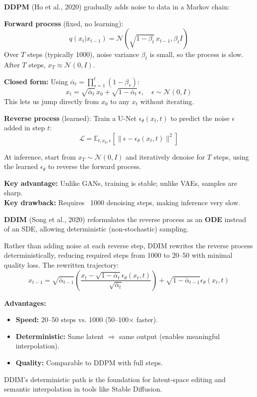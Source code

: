 \begin{paperbox}[title={DDPM: Denoising Diffusion Probabilistic Models}]
\textbf{DDPM} (Ho et al., 2020) gradually adds noise to data in a Markov chain:

\textbf{Forward process} (fixed, no learning):
\[
q(x_t | x_{t-1}) = \mathcal{N}\left(\sqrt{1 - \beta_t} \, x_{t-1}, \beta_t I\right)
\]
Over $T$ steps (typically 1000), noise variance $\beta_t$ is small, so the process is slow. After $T$ steps, $x_T \approx \mathcal{N}(0, I)$.

\textbf{Closed form:} Using $\bar{\alpha}_t = \prod_{s=1}^t (1 - \beta_s)$:
\[
x_t = \sqrt{\bar{\alpha}_t} \, x_0 + \sqrt{1 - \bar{\alpha}_t} \, \epsilon, \quad \epsilon \sim \mathcal{N}(0, I)
\]
This lets us jump directly from $x_0$ to any $x_t$ without iterating.

\textbf{Reverse process} (learned): Train a U-Net $\epsilon_\theta(x_t, t)$ to predict the noise $\epsilon$ added in step $t$:
\[
\mathcal{L} = \mathbb{E}_{t, x_0, \epsilon}[\|\epsilon - \epsilon_\theta(x_t, t)\|^2]
\]

\begin{intuitionbox}
At inference, start from $x_T \sim \mathcal{N}(0, I)$ and iteratively denoise for $T$ steps, using the learned $\epsilon_\theta$ to reverse the forward process.
\end{intuitionbox}

\textbf{Key advantage:} Unlike GANs, training is stable; unlike VAEs, samples are sharp. \\
\textbf{Key drawback:} Requires ~1000 denoising steps, making inference very slow.
\end{paperbox}

\begin{paperbox}[title={DDIM: Deterministic Sampling}]
\textbf{DDIM} (Song et al., 2020) reformulates the reverse process as an \textbf{ODE} instead of an SDE, allowing deterministic (non-stochastic) sampling.

Rather than adding noise at each reverse step, DDIM rewrites the reverse process deterministically, reducing required steps from 1000 to 20--50 with minimal quality loss. The rewritten trajectory:
\[
x_{t-1} = \sqrt{\bar{\alpha}_{t-1}} \left( \frac{x_t - \sqrt{1-\bar{\alpha}_t} \epsilon_\theta(x_t, t)}{\sqrt{\bar{\alpha}_t}} \right) + \sqrt{1-\bar{\alpha}_{t-1}} \epsilon_\theta(x_t, t)
\]

\textbf{Advantages:}
\begin{itemize}
  \item \textbf{Speed:} 20--50 steps vs. 1000 (50--100× faster).
  \item \textbf{Deterministic:} Same latent $\Rightarrow$ same output (enables meaningful interpolation).
  \item \textbf{Quality:} Comparable to DDPM with full steps.
\end{itemize}

\begin{notebox}
DDIM's deterministic path is the foundation for latent-space editing and semantic interpolation in tools like Stable Diffusion.
\end{notebox}
\end{paperbox}


